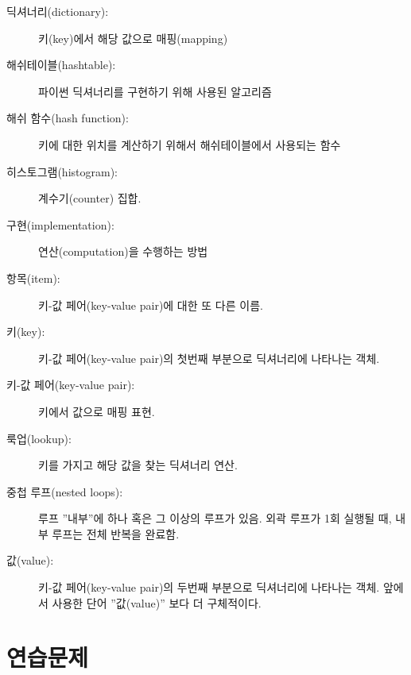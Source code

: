 \begin{description}

\item[딕셔너리(dictionary):] 키(key)에서 해당 값으로 매핑(mapping)

\item[해쉬테이블(hashtable):] 파이썬 딕셔너리를 구현하기 위해 사용된 알고리즘

\item[해쉬 함수(hash function):] 키에 대한 위치를 계산하기 위해서 해쉬테이블에서 사용되는 함수

\item[히스토그램(histogram):] 계수기(counter) 집합.

\item[구현(implementation):] 연산(computation)을 수행하는 방법

\item[항목(item):] 키-값 페어(key-value pair)에 대한 또 다른 이름.

\item[키(key):] 키-값 페어(key-value pair)의 첫번째 부분으로 딕셔너리에 나타나는 객체.

\item[키-값 페어(key-value pair):] 키에서 값으로 매핑 표현.

\item[룩업(lookup):] 키를 가지고 해당 값을 찾는 딕셔너리 연산.

\item[중첩 루프(nested loops):] 루프 ''내부''에 하나 혹은 그 이상의 루프가 있음. 
외곽 루프가 1회 실행될 때, 내부 루프는 전체 반복을 완료함.

\item[값(value):] 키-값 페어(key-value pair)의 두번째 부분으로 딕셔너리에 나타나는 객체. 
앞에서 사용한 단어 ''값(value)'' 보다 더 구체적이다.

\end{description}

\section{연습문제}

